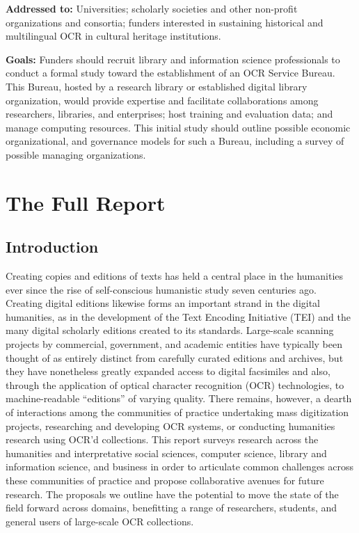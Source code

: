 \documentclass[twoside,11pt]{report}
\begin{document}
\begin{enumerate}
\textbf{Addressed to:} Universities; scholarly societies and other non-profit organizations and consortia; funders interested in sustaining historical and multilingual OCR in cultural heritage institutions.

\textbf{Goals:} Funders should recruit library and information science professionals to conduct a formal study toward the establishment of an OCR Service Bureau. This Bureau, hosted by a research library or established digital library organization, would provide expertise and facilitate collaborations among researchers, libraries, and enterprises; host training and evaluation data; and manage computing resources. This initial study should outline possible economic organizational, and governance models for such a Bureau, including a survey of possible managing organizations.

\end{enumerate}

\chapter{The Full Report}

\section{Introduction}

Creating copies and editions of texts has held a central place in the humanities ever since the rise of self-conscious humanistic study seven centuries ago. Creating digital editions likewise forms an important strand in the digital humanities, as in the development of the Text Encoding Initiative (TEI) and the many digital scholarly editions created to its standards. Large-scale scanning projects by commercial, government, and academic entities have typically been thought of as entirely distinct from carefully curated editions and archives, but they have nonetheless greatly expanded access to digital facsimiles and also, through the application of optical character recognition (OCR) technologies, to machine-readable ``editions'' of varying quality. There remains, however, a dearth of interactions among the communities of practice undertaking mass digitization projects, researching and developing OCR systems, or conducting humanities research using OCR'd collections. This report surveys research across the humanities and interpretative social sciences, computer science, library and information science, and business in order to articulate common challenges across these communities of practice and propose collaborative avenues for future research. The proposals we outline have the potential to move the state of the field forward across domains, benefitting a range of researchers, students, and general users of large-scale OCR collections.
\end{document}
